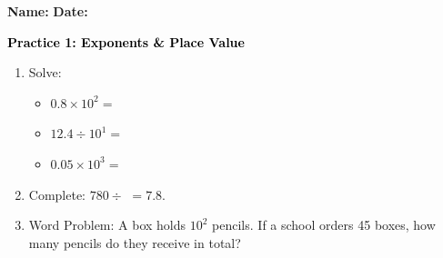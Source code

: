 \documentclass[12pt, letterpaper, fleqn]{article}
\newcommand{\blank}{\underline{\hspace{2.2cm}}}
\begin{document}
\textbf{Name:} \underline{\hspace{5cm}}
\hfill
\textbf{Date:} \underline{\hspace{3cm}}\\

\begin{tcolorbox}[colback=customteal!20]
    \large\textcolor{black}{\textbf{Practice 1: Exponents \& Place Value}}
\end{tcolorbox}
\begin{enumerate}[itemsep=3.5cm, leftmargin=0.6cm]
\item Solve:
  \begin{itemize}[itemsep=0.8cm]
    \item $0.8 \times 10^2 =$ \blank
    \item $12.4 \div 10^1 =$ \blank
    \item $0.05 \times 10^3 =$ \blank
  \end{itemize}
\item Complete: $780 \div$ \blank $= 7.8$.
\vspace{3cm}
\item Word Problem: A box holds $10^2$ pencils. If a school orders 45 boxes, how many pencils do they receive in total?
\end{enumerate}
\end{document}
